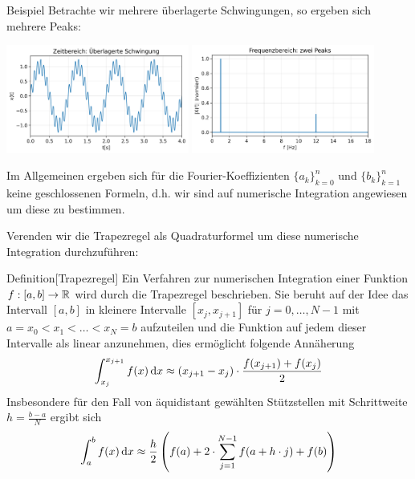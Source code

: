 \begin{colbox}{Beispiel}
  Betrachte wir mehrere überlagerte Schwingungen, so ergeben sich mehrere Peaks:
  
  \begin{center}
    \includegraphics[width=0.45\textwidth]{figures/zeit_sinus_summe.png}
    \hfill
    \includegraphics[width=0.45\textwidth]{figures/spektrum_sinus_summe.png}
  \end{center}

\end{colbox}

Im Allgemeinen ergeben sich für die Fourier-Koeffizienten $\{a_k\}_{k=0}^n$ und $\{b_k\}_{k=1}^n$ keine geschlossenen 
Formeln, d.h. wir sind auf numerische Integration angewiesen um diese zu bestimmen.

Verenden wir die Trapezregel als Quadraturformel um diese numerische Integration durchzuführen:

\begin{colbox}{Definition}[Trapezregel]
  Ein Verfahren zur numerischen Integration einer Funktion $f:[a,b]\to\mathbb R$ wird durch die Trapezregel beschrieben. Sie 
  beruht auf der Idee das Intervall $[a,b]$ in kleinere Intervalle $[x_j, x_{j+1}]$ für $j=0,\dots,N-1$ mit 
  $a=x_0<x_1<\dots<x_N=b$ aufzuteilen und die Funktion auf jedem dieser Intervalle als linear anzunehmen, 
  dies ermöglicht folgende Annäherung 
  \begin{align*}
    \int_{x_j}^{x_{j+1}} f(x) \mathop{}\!\mathrm{d} x \approx (x_{j+1}-x_j)\cdot\dfrac{f(x_{j+1})+f(x_j)}{2}
  \end{align*}
  Insbesondere für den Fall von äquidistant gewählten Stützstellen mit Schrittweite $h=\tfrac{b-a}{N}$ ergibt sich
  \begin{align*}
    \int_{a}^{b} f(x) \mathop{}\!\mathrm{d} x \approx \dfrac{h}{2}\left(f(a) + 2\cdot\sum_{j=1}^{N-1}f(a + h\cdot j) + f(b) \right)
  \end{align*}
\end{colbox}

